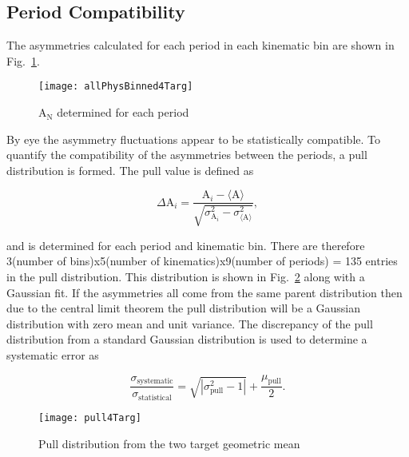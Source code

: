 \subsection{Period Compatibility}
The asymmetries calculated for each period in each kinematic bin are shown in
Fig.~\ref{fig::allPhysBinned4Targ}.

\begin{figure}[h!t]
  \begin{center}
    \texttt{[image: allPhysBinned4Targ]}
    \caption{A$_{\mathrm{N}}$ determined for each period}
    \label{fig::allPhysBinned4Targ}
  \end{center}
\end{figure}

\noindent
By eye the asymmetry fluctuations appear to be statistically compatible.  To
quantify the compatibility of the asymmetries between the periods, a pull
distribution is formed.  The pull value is defined as

\begin{equation}
  \label{eq::pull}
  \Delta\mathrm{A}_i =
  \frac{
    \mathrm{A}_i - \langle \mathrm{A} \rangle
  }{
    \sqrt{
      \sigma^2_{\mathrm{A}_i} - \sigma^2_{\langle \mathrm{A} \rangle}
    }
  },
\end{equation}

\noindent
and is determined for each period and kinematic bin.  There are therefore
3(number of bins)x5(number of kinematics)x9(number of periods) = 135 entries in
the pull distribution. This distribution is shown in Fig.~\ref{fig::pull4Targ}
along with a Gaussian fit.  If the asymmetries all come from the same parent
distribution then due to the central limit theorem the pull distribution will be
a Gaussian distribution with zero mean and unit variance.  The discrepancy of
the pull distribution from a standard Gaussian distribution is used to determine
a systematic error as

\begin{equation}
  \label{equ::sysErrorPull}
  \frac{\sigma_{\mathrm{systematic}}}{\sigma_{\mathrm{statistical}}} =
  \sqrt{|\sigma^2_{\mathrm{pull}} - 1|} + \frac{\mu_{\mathrm{pull}}}{2}.
\end{equation}

\begin{figure}[h!t]
  \begin{center}
    \texttt{[image: pull4Targ]}
    \caption{Pull distribution from the two target geometric mean}
    \label{fig::pull4Targ}
  \end{center}
\end{figure}

